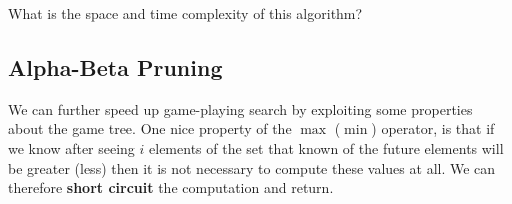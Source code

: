 \documentclass[11pt]{article}
\begin{document}

\begin{algorithm}[h]
\begin{algorithmic}[1]

  \EndFor{}
  \EndFor{}
  \EndIf{}
  \EndProcedure{}
\end{algorithmic}
\end{algorithm}



\begin{exercise}
  What is the space and time complexity of this algorithm?
\end{exercise}



\subsection{Alpha-Beta Pruning}

We can further speed up game-playing search by exploiting some properties about the game tree.  One nice property of the $\max$ ($\min$) operator, is that if we know after seeing $i$ elements of the set that known of the future elements will be greater (less) then it is not necessary to compute these values at all. We can therefore \textbf{short circuit} the computation and return.
\end{document}
